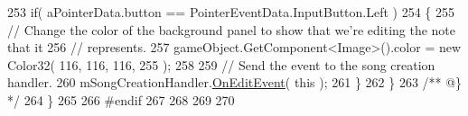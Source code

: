 \begin{DoxyCodeInclude}
253         \textcolor{keywordflow}{if}( aPointerData.button == PointerEventData.InputButton.Left )
254         \{
255             \textcolor{comment}{// Change the color of the background panel to show that we're editing the note that it }
256             \textcolor{comment}{// represents.}
257             gameObject.GetComponent<Image>().color = \textcolor{keyword}{new} Color32( 116, 116, 116, 255 );
258 
259             \textcolor{comment}{// Send the event to the song creation handler.}
260             mSongCreationHandler.\hyperlink{group___s_c_m_handlers_gacb552a4f02b22d7c10a8420eb1431201}{OnEditEvent}( \textcolor{keyword}{this} );
261         \}
262     \}\textcolor{comment}{}
263 \textcolor{comment}{    /** @\} */}
264 \}
265  
266 \textcolor{preprocessor}{#endif}
267  
268  
269  
270  
\end{DoxyCodeInclude}
 
